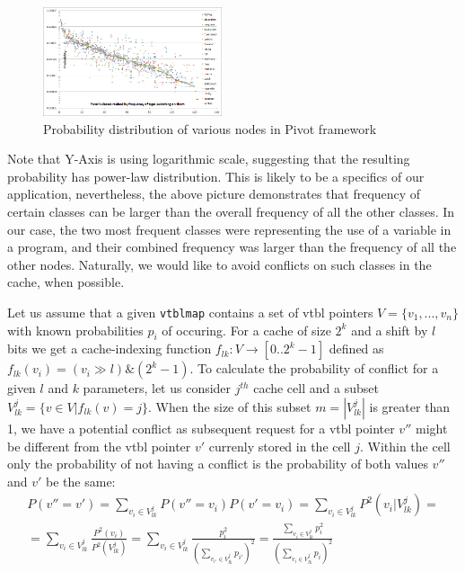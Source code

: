 \documentclass[preprint]{sigplanconf}
\makeatletter
\DeclareRobustCommand{\code}[1]{{\lstinline[breaklines=false,escapechar=@]{#1}}}
\makeatother
\begin{document}
\begin{figure}[htbp]
  \centering
    \includegraphics[width=0.47\textwidth]{std-lib-power-law-distributions.png}
  \caption{Probability distribution of various nodes in Pivot framework}
  \label{fig:PowerLaw}
\end{figure}

Note that Y-Axis is using logarithmic scale, suggesting that the resulting 
probability has power-law distribution. This is likely to be a specifics of our 
application, nevertheless, the above picture demonstrates that frequency of certain 
classes can be larger than the overall frequency of all the other classes. In 
our case, the two most frequent classes were representing the use of a variable in 
a program, and their combined frequency was larger than the frequency of all the 
other nodes. Naturally, we would like to avoid conflicts on such classes in the 
cache, when possible.

Let us assume that a given \code{vtblmap} contains a set of vtbl pointers 
$V = \{v_1, ... , v_n\}$ with known probabilities $p_i$ of occuring. For a cache 
of size $2^k$ and a shift by $l$ bits we get a cache-indexing function 
$f_{lk} : V \rightarrow [0..2^k-1]$ defined as $f_{lk}(v_i) = (v_i \gg l) \& (2^k-1)$.
To calculate the probability of conflict for a given $l$ and $k$ parameters, let 
us consider $j^{th}$ cache cell and a subset $V^j_{lk}=\{v \in V | f_{lk}(v)=j\}$. 
When the size of this subset $m=|V^j_{lk}|$ is greater than 1, we have a 
potential conflict as subsequent request for a vtbl pointer $v''$ might be 
different from the vtbl pointer $v'$ currenly stored in the cell $j$. Within the 
cell only the probability of not having a conflict is the probability of both 
values $v''$ and $v'$ be the same:
\begin{eqnarray*}
P(v''=v')=\sum\limits_{v_i \in V^j_{lk}}P(v''=v_i)P(v'=v_i)=\sum\limits_{v_i \in V^j_{lk}}P^2(v_i|V^j_{lk})=\\
=\sum\limits_{v_i \in V^j_{lk}}\frac{P^2(v_i)}{P^2(V^j_{lk})}=
\sum\limits_{v_i \in V^j_{lk}}\frac{p_i^2}{(\sum\limits_{v_{i'} \in V^j_{lk}}p_{i'})^2}=
\frac{\sum\limits_{v_i \in V^j_{lk}}p_i^2}{(\sum\limits_{v_{i} \in V^j_{lk}}p_{i})^2}
\end{eqnarray*}
\end{document}
